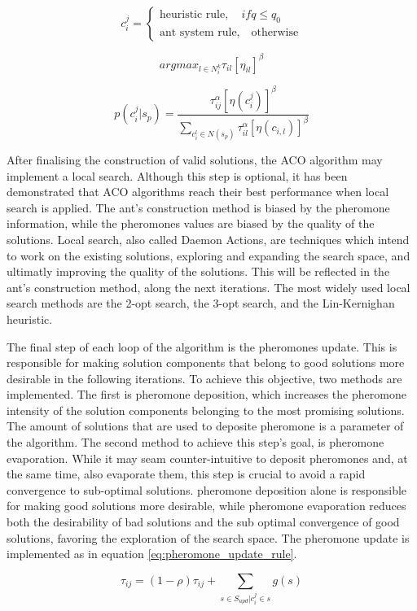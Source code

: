 \begin{equation} \label{eq:component_selection}
	c_{i}^{j} =
		\begin{cases}
			\textrm{heuristic rule}, \quad if q \leq q_{0} \\
			\textrm{ant system rule,} \quad \textrm{otherwise}
		\end{cases}
\end{equation}

\begin{equation} \label{eq:heuristic_rule}
	arg max_{l \in N_{i}^{k} } \tau_{il}[\eta_{il}]^{\beta}
\end{equation}


\begin{equation} \label{eq:ant_system_rule}
	p(c_{i}^{j}|s_{p}) = \frac{\tau_{ij}^{\alpha}  [\eta(c_{i}^{j})]^{\beta}}{\sum_{c_{i}^{l} \in N(s_{p})} \tau_{il}^{\alpha} [\eta(c_{i,l})]^{\beta}}
\end{equation}


After finalising the construction of valid solutions, the ACO algorithm may implement
a local search. Although this step is optional, it has been demonstrated that
ACO algorithms reach their best performance when local search is applied.
The ant's construction method is biased by the pheromone information,
while the pheromones values are biased by the quality of the solutions.
Local search, also called Daemon Actions, are techniques which intend to work on
the existing solutions, exploring and expanding the search space, and ultimatly
improving the quality of the solutions. This will be reflected in
the ant's construction method, along the next iterations. The most widely
used local search methods are the 2-opt search, the 3-opt search,
and the Lin-Kernighan heuristic.

The final step of each loop of the algorithm is the pheromones update. This is
responsible for making solution components that belong to good solutions more desirable
in the following iterations. To achieve this objective, two methods are implemented.
The first is pheromone deposition, which increases the pheromone intensity
of the solution components belonging to the most promising solutions. The amount
of solutions that are used to deposite pheromone is a parameter of the algorithm.
The second method to achieve this step's goal, is pheromone evaporation.
While it may seam counter-intuitive to deposit pheromones and, at the same time, also
evaporate them, this step is crucial to avoid a rapid convergence to sub-optimal
solutions. pheromone deposition alone is responsible for making good solutions more
desirable, while pheromone evaporation reduces both the desirability of
bad solutions and the sub optimal convergence of good solutions, favoring the exploration
of the search space. The pheromone update is implemented as in equation \ref{eq:pheromone_update_rule}.

\begin{equation} \label{eq:pheromone_update_rule}
		\tau_{ij} = (1-\rho)\tau_{ij} + \sum_{s\in S_{upd}|c_{i}^{j}\in s}g(s)
\end{equation}